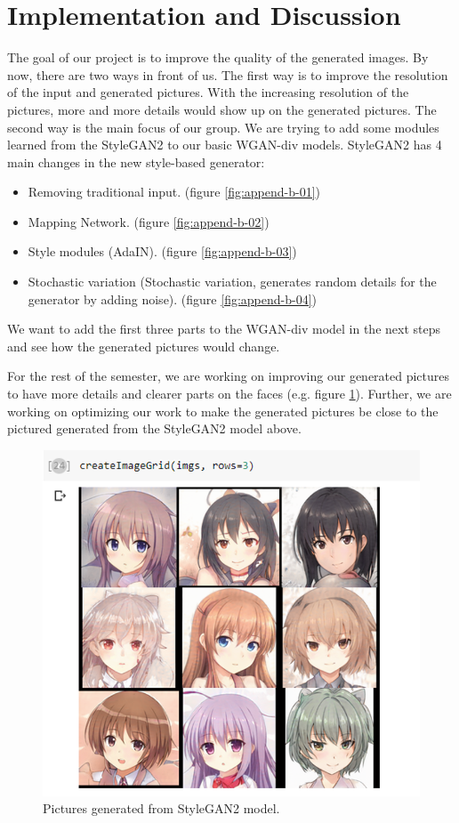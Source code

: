\documentclass[a4paper,11pt]{article}
\begin{document}
\section{Implementation and Discussion}
The goal of our project is to improve the quality of the generated images. By now, there are two ways in front of us. The first way is to improve the resolution of the input and generated pictures. With the increasing resolution of the pictures, more and more details would show up on the generated pictures. The second way is the main focus of our group. We are trying to add some modules learned from the StyleGAN2 to our basic WGAN-div models. StyleGAN2 has 4 main changes in the new style-based generator:
\begin{itemize}
    \item Removing traditional input. (figure \ref{fig:append-b-01})
    \item Mapping Network. (figure \ref{fig:append-b-02})
    \item Style modules (AdaIN). (figure \ref{fig:append-b-03})
    \item Stochastic variation (Stochastic variation, generates random details for the generator by adding noise). (figure \ref{fig:append-b-04})
\end{itemize}
We want to add the first three parts to the WGAN-div model in the next steps and see how the generated pictures would change.

For the rest of the semester, we are working on improving our generated pictures to have more details and clearer parts on the faces (e.g. figure \ref{fig:result-expect}). Further, we are working on optimizing our work to make the generated pictures be close to the pictured generated from the StyleGAN2 model above.
\begin{figure}[htb]
    \centering
    \includegraphics[width=0.5\linewidth]{figure/result-expect.png}
    \caption{Pictures generated from StyleGAN2 model.}
    \label{fig:result-expect}
\end{figure}
\end{document}
